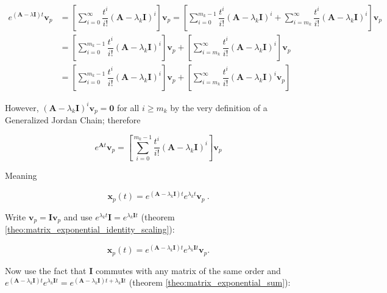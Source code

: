 \begin{align}
	e^{\left(\mathbf{A}-\lambda\mathbf{I}\right)t}\mathbf{v}_p &= \left[\displaystyle\sum\limits_{i=0}^{\infty} \dfrac{t^i}{i!}\left(\mathbf{A} - \lambda_k\mathbf{I}\right)^{i}\right]\mathbf{v}_p = \left[\sum\limits_{i=0}^{m_k-1} \dfrac{t^i}{i!}\left(\mathbf{A} - \lambda_k\mathbf{I}\right)^{i} + \displaystyle\sum\limits_{i=m_k}^{\infty} \dfrac{t^i}{i!}\left(\mathbf{A} - \lambda_k\mathbf{I}\right)^{i}\right]\mathbf{v}_p  \nonumber\\[5mm]
%
	&= \left[\sum\limits_{i=0}^{m_k-1} \dfrac{t^i}{i!}\left(\mathbf{A} - \lambda_k\mathbf{I}\right)^{i}\right]\mathbf{v}_p + \left[\sum\limits_{i=m_k}^{\infty} \dfrac{t^i}{i!}\left(\mathbf{A} - \lambda_k\mathbf{I}\right)^{i}\right]\mathbf{v}_p \nonumber\\[5mm]
%
	&= \left[\sum\limits_{i=0}^{m_k-1} \dfrac{t^i}{i!}\left(\mathbf{A} - \lambda_k\mathbf{I}\right)^{i}\right]\mathbf{v}_p + \left[\sum\limits_{i=m_k}^{\infty} \dfrac{t^i}{i!}\left(\mathbf{A} - \lambda_k\mathbf{I}\right)^{i}\mathbf{v}_p\right]
\end{align}

	However, $\left(\mathbf{A} - \lambda_k\mathbf{I}\right)^{i}\mathbf{v}_p = \mathbf{0}$ for all $i \geq m_k$ by the very definition of a Generalized Jordan Chain; therefore

\begin{equation} e^{\mathbf{A}t}\mathbf{v}_p = \left[\sum\limits_{i=0}^{m_k-1} \dfrac{t^i}{i!}\left(\mathbf{A} - \lambda_k\mathbf{I}\right)^{i}\right]\mathbf{v}_p \end{equation}

	Meaning

\begin{equation} \mathbf{x}_p(t) = e^{\left(\mathbf{A}-\lambda_k\mathbf{I}\right)t}e^{\lambda_k t}\mathbf{v}_p\ . \end{equation}

	Write $\mathbf{v}_p = \mathbf{Iv}_p$ and use $e^{\lambda_k t}\mathbf{I} = e^{\lambda_k\mathbf{I} t}$ (theorem \ref{theo:matrix_exponential_identity_scaling}):

\begin{equation} \mathbf{x}_p(t) = e^{\left(\mathbf{A}-\lambda_k\mathbf{I}\right)t}e^{\lambda_k \mathbf{I} t}\mathbf{v}_p . \end{equation}

	Now use the fact that $\mathbf{I}$ commutes with any matrix of the same order and $e^{\left(\mathbf{A}-\lambda_k\mathbf{I}\right)t}e^{\lambda_k \mathbf{I} t} = e^{\left(\mathbf{A}-\lambda_k\mathbf{I}\right)t + \lambda_k \mathbf{I} t}$ (theorem \ref{theo:matrix_exponential_sum}):

